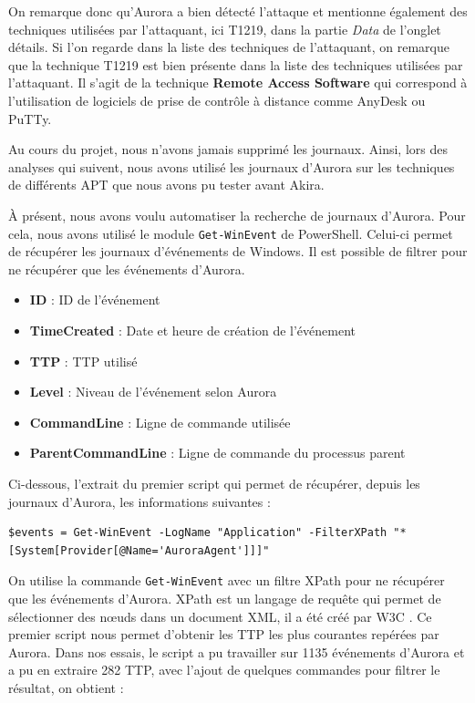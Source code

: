 \documentclass[12pt,letterpaper]{article}
\begin{document}
\bigskip

On remarque donc qu'Aurora a bien détecté l'attaque et mentionne également des techniques utilisées par l'attaquant, ici T1219, dans la partie \textit{Data} de l'onglet détails.
Si l'on regarde dans la liste des techniques de l'attaquant, on remarque que la technique T1219 est bien présente dans la liste des techniques utilisées par l'attaquant.
Il s'agit de la technique \textbf{Remote Access Software} qui correspond à l'utilisation de logiciels de prise de contrôle à distance comme AnyDesk ou PuTTy.

\bigskip

Au cours du projet, nous n'avons jamais supprimé les journaux.
Ainsi, lors des analyses qui suivent, nous avons utilisé les journaux d'Aurora sur les techniques de différents APT que nous avons pu tester avant Akira.

\newpage

À présent, nous avons voulu automatiser la recherche de journaux d'Aurora.
Pour cela, nous avons utilisé le module \verb|Get-WinEvent| de PowerShell.
Celui-ci permet de récupérer les journaux d'événements de Windows.
Il est possible de filtrer pour ne récupérer que les événements d'Aurora.
\begin{itemize}
    \item \textbf{ID} : ID de l'événement
    \item \textbf{TimeCreated} : Date et heure de création de l'événement
    \item \textbf{TTP} : TTP utilisé
    \item \textbf{Level} : Niveau de l'événement selon Aurora
    \item \textbf{CommandLine} : Ligne de commande utilisée
    \item \textbf{ParentCommandLine} : Ligne de commande du processus parent
\end{itemize}

Ci-dessous, l'extrait du premier script qui permet de récupérer, depuis les journaux d'Aurora, les informations suivantes :

\begin{lstlisting}[caption={Récupération des journaux d'Aurora}, label={lst:aurora_logs}]
$events = Get-WinEvent -LogName "Application" -FilterXPath "*[System[Provider[@Name='AuroraAgent']]]"
\end{lstlisting}

On utilise la commande \verb|Get-WinEvent| avec un filtre XPath pour ne récupérer que les événements d'Aurora.
XPath est un langage de requête qui permet de sélectionner des nœuds dans un document XML, il a été créé par W3C \cite{XMLPathLanguage}.
Ce premier script nous permet d'obtenir les TTP les plus courantes repérées par Aurora.
Dans nos essais, le script a pu travailler sur 1135 événements d'Aurora et a pu en extraire 282 TTP, avec l'ajout de quelques commandes pour filtrer le résultat, on obtient :
\end{document}
